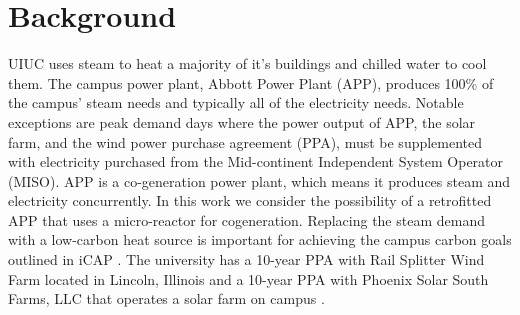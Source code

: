 \section{Background}

UIUC uses steam to heat a majority of it's buildings and chilled water to cool them. The campus power plant, Abbott Power Plant (APP), produces 100\% of the campus' steam needs and typically all of the electricity needs. Notable exceptions are peak demand days where the power output of APP, the solar farm, and the wind power purchase agreement (PPA), must be supplemented with electricity purchased from the Mid-continent Independent System Operator (MISO). APP is a co-generation power plant, which means it produces steam and electricity concurrently. In this work we consider the possibility of a retrofitted APP that uses a micro-reactor for cogeneration. Replacing the steam demand with a low-carbon heat source is important for achieving the campus carbon goals outlined in iCAP \cite{isee_illinois_2015}. The university has a 10-year PPA with Rail Splitter Wind Farm located in Lincoln, Illinois and a 10-year PPA with Phoenix Solar South Farms, LLC that operates a solar farm on campus \cite{breitweiser_wind_2016,white_solar_2017}. 